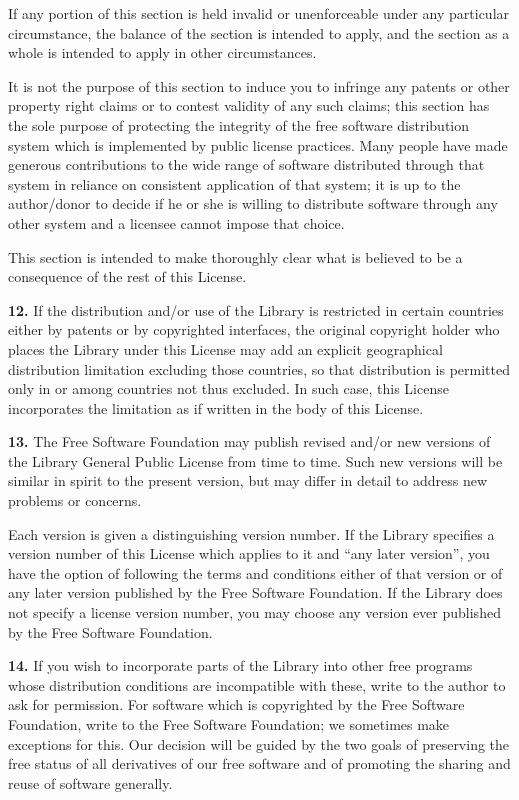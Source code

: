 \documentclass[]{article}
\begin{document}
If any portion of this section is held invalid or unenforceable under
any particular circumstance, the balance of the section is intended to
apply, and the section as a whole is intended to apply in other
circumstances.

It is not the purpose of this section to induce you to infringe any
patents or other property right claims or to contest validity of any
such claims; this section has the sole purpose of protecting the
integrity of the free software distribution system which is implemented
by public license practices. Many people have made generous
contributions to the wide range of software distributed through that
system in reliance on consistent application of that system; it is up to
the author/donor to decide if he or she is willing to distribute
software through any other system and a licensee cannot impose that
choice.

This section is intended to make thoroughly clear what is believed to be
a consequence of the rest of this License.

\textbf{12.} If the distribution and/or use of the Library is restricted
in certain countries either by patents or by copyrighted interfaces, the
original copyright holder who places the Library under this License may
add an explicit geographical distribution limitation excluding those
countries, so that distribution is permitted only in or among countries
not thus excluded. In such case, this License incorporates the
limitation as if written in the body of this License.

\textbf{13.} The Free Software Foundation may publish revised and/or new
versions of the Library General Public License from time to time. Such
new versions will be similar in spirit to the present version, but may
differ in detail to address new problems or concerns.

Each version is given a distinguishing version number. If the Library
specifies a version number of this License which applies to it and ``any
later version'', you have the option of following the terms and
conditions either of that version or of any later version published by
the Free Software Foundation. If the Library does not specify a license
version number, you may choose any version ever published by the Free
Software Foundation.

\textbf{14.} If you wish to incorporate parts of the Library into other
free programs whose distribution conditions are incompatible with these,
write to the author to ask for permission. For software which is
copyrighted by the Free Software Foundation, write to the Free Software
Foundation; we sometimes make exceptions for this. Our decision will be
guided by the two goals of preserving the free status of all derivatives
of our free software and of promoting the sharing and reuse of software
generally.
\end{document}
